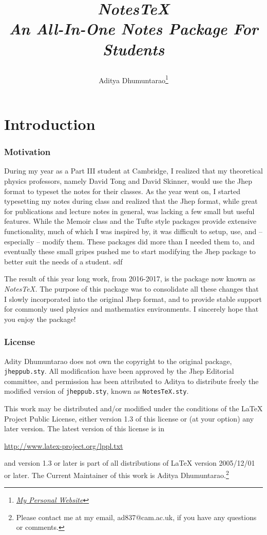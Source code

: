 \documentclass[10pt]{article}
\title{\begin{center}{\Huge \textit{NotesTeX}}\\{{\itshape An All-In-One Notes Package For Students}}\end{center}}
\author{Aditya Dhumuntarao\footnote{\href{https://geodesick.com/}{\textit{My Personal Website}}}}
\affiliation{
DAMTP, University of Cambridge\\
Perimeter Institute of Theoretical Physics\\
University of Minnesota
}
\begin{document}
	\maketitle
	\flushbottom
	\newpage
	\pagestyle{fancynotes}
	\part{Introduction}	
	\section{Motivation}\label{Sec:Motivation}
	During my year as a Part III student at Cambridge, I realized that my theoretical physics professors, namely David Tong and David Skinner, would use the Jhep format to typeset the notes for their classes. As the year went on, I started typesetting my notes during class and realized that the Jhep format, while great for publications and lecture notes in general, was lacking a few small but useful features. While the Memoir class and the Tufte style packages provide extensive functionality, much of which I was inspired by, it was difficult to setup, use, and -- especially -- modify them. These packages did more than I needed them to, and eventually these small gripes pushed me to start modifying the Jhep package to better suit the needs of a student. sdf

	The result of this year long work, from 2016-2017, is the package now known as \textit{NotesTeX.} The purpose of this package was to consolidate all these changes that I slowly incorporated into the original Jhep format, and to provide stable support for commonly used physics and mathematics environments. I sincerely hope that you enjoy the package!
	
	\section{License}\label{Sec:License}
	Adity Dhumuntarao does not own the copyright to the original package, \texttt{jheppub.sty}. All modification have been approved by the Jhep Editorial committee, and permission has been attributed to Aditya to distribute freely the modified version of \texttt{jheppub.sty}, known as \texttt{NotesTeX.sty}.

	This work may be distributed and/or modified under the conditions of the LaTeX Project Public License, either version 1.3 of this license or (at your option) any later version. The latest version of this license is in 
	\begin{center}
		\href{http://www.latex-project.org/lppl.txt}{http://www.latex-project.org/lppl.txt}
	\end{center}
	and version 1.3 or later is part of all distributions of LaTeX version 2005/12/01 or later. The Current Maintainer of this work is Aditya Dhumuntarao.\footnote{Please contact me at my email, ad837@cam.ac.uk, if you have any questions or comments.}
\end{document}
